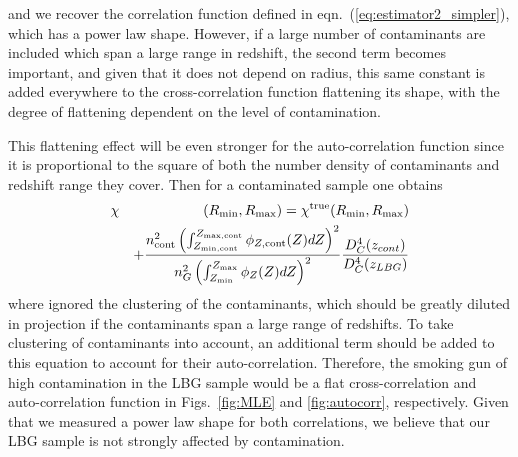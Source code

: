 \documentclass[iop, revtex4]{emulateapj}
\begin{document}
and we recover the correlation function defined in
eqn.~(\ref{eq:estimator2_simpler}), which has a power law shape. However, if a
large number of contaminants are included which span a large range in
redshift, the second term becomes important, and given that it does not
depend on radius, this same constant is added everywhere to the
cross-correlation function flattening its shape, with the degree of flattening
dependent on the level of contamination.

This flattening effect will be even stronger for the auto-correlation
function  since it is proportional to the square of both the
number density of contaminants and redshift range they cover. Then for a contaminated
sample one obtains
\begin{eqnarray}
\chi &&(R_{\rm min}, R_{\rm max})= \chi^{\rm true}(R_{\rm min},  R_{\rm max}) \nonumber \\
&&+ \frac{n^{2}_{\rm cont}\left(\int_{Z_{\rm min, cont}}^{Z_{\rm max, cont}} \phi_{Z, \rm cont}(Z)dZ\right)^{2} }{n^{2}_{G} \left(\int_{Z_{\rm min}}^{Z_{\rm max}} \phi_{Z}(Z)dZ\right)^{2}} \frac{D_{C}^{4}(z_{cont})}{D_{C}^{4}(z_{LBG})} 
\label{eq:estimator_contam_auto}
\end{eqnarray}
where ignored the clustering of the contaminants, which should be
greatly diluted in projection if the contaminants span a large range
of redshifts.  To take clustering of contaminants into account, an
additional term should be added to this equation to account for their
auto-correlation. Therefore, the smoking gun of high contamination in
the LBG sample would be a flat cross-correlation and auto-correlation
function in Figs.~\ref{fig:MLE} and \ref{fig:autocorr}, respectively.
Given that we measured a power law shape for both correlations, we believe 
that our LBG sample is not strongly affected by contamination. 
\end{document}
